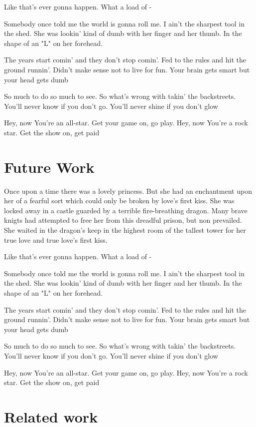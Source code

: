 \documentclass{article}
\begin{document}
Like that's ever gonna happen.  What a load of - 

Somebody once told me the world is gonna roll me. I ain't the sharpest tool in the shed. She was lookin' kind of dumb with her finger and her thumb.  In the shape of an "L" on her forehead.

The years start comin' and they don't stop comin'. Fed to the rules and hit the ground runnin'.  Didn't make sense not to live for fun.  Your brain gets smart but your head gets dumb

So much to do so much to see. So what's wrong with takin' the backstreets.  You'll never know if you don't go.  You'll never shine if you don't glow 

Hey, now You're an all-star.  Get your game on, go play.  Hey, now You're a rock star.  Get the show on, get paid

\section{Future Work}

Once upon a time there was a lovely princess.  But she had an enchantment upon her of a fearful sort which could only be broken by love's first kiss.  She was locked away in a castle guarded by a terrible fire-breathing dragon.  Many brave knigts had attempted to free her from this dreadful prison, but non prevailed.  She waited in the dragon's keep in the highest room of the tallest tower for her true love and true love's first kiss.

Like that's ever gonna happen.  What a load of - 

Somebody once told me the world is gonna roll me. I ain't the sharpest tool in the shed. She was lookin' kind of dumb with her finger and her thumb.  In the shape of an "L" on her forehead.

The years start comin' and they don't stop comin'. Fed to the rules and hit the ground runnin'.  Didn't make sense not to live for fun.  Your brain gets smart but your head gets dumb

So much to do so much to see. So what's wrong with takin' the backstreets.  You'll never know if you don't go.  You'll never shine if you don't glow 

Hey, now You're an all-star.  Get your game on, go play.  Hey, now You're a rock star.  Get the show on, get paid

\section{Related work}
\end{document}
